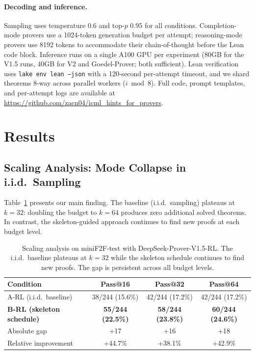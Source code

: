 \documentclass{article}
\begin{document}
\paragraph{Decoding and inference.}
Sampling uses temperature 0.6 and top-$p$ 0.95 for all conditions. Completion-mode provers use a 1024-token generation budget per attempt; reasoning-mode provers use 8192 tokens to accommodate their chain-of-thought before the Lean code block. Inference runs on a single A100 GPU per experiment (80GB for the V1.5 runs, 40GB for V2 and Goedel-Prover; both sufficient). Lean verification uses \texttt{lake env lean --json} with a 120-second per-attempt timeout, and we shard theorems 8-way across parallel workers ($i \bmod 8$). Full code, prompt templates, and per-attempt logs are available at \url{https://github.com/zacn04/icml_hints_for_provers}.


\section{Results}

\subsection{Scaling Analysis: Mode Collapse in i.i.d.\ Sampling}
\label{sec:scaling}

Table~\ref{tab:scaling} presents our main finding. The baseline (i.i.d.\ sampling) plateaus at $k{=}32$: doubling the budget to $k{=}64$ produces zero additional solved theorems. In contrast, the skeleton-guided approach continues to find new proofs at each budget level.

\begin{table}[t]
\centering
\begin{tabular}{lccc}
\toprule
\textbf{Condition} & \textbf{Pass@16} & \textbf{Pass@32} & \textbf{Pass@64} \\
\midrule
A-RL (i.i.d.\ baseline) & 38/244 (15.6\%) & 42/244 (17.2\%) & 42/244 (17.2\%) \\
\textbf{B-RL (skeleton schedule)} & \textbf{55/244 (22.5\%)} & \textbf{58/244 (23.8\%)} & \textbf{60/244 (24.6\%)} \\
\midrule
Absolute gap & +17 & +16 & +18 \\
Relative improvement & +44.7\% & +38.1\% & +42.9\% \\
\bottomrule
\end{tabular}
\caption{Scaling analysis on miniF2F-test with DeepSeek-Prover-V1.5-RL. The i.i.d.\ baseline plateaus at $k{=}32$ while the skeleton schedule continues to find new proofs. The gap is persistent across all budget levels.}
\label{tab:scaling}
\end{table}
\end{document}
